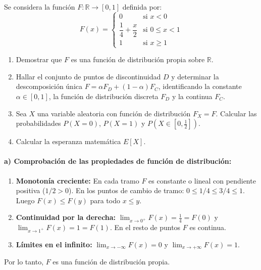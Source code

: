\begin{problema}
Se considera la función $F : \mathbb{R} \to [0, 1]$ definida por:
\[
    F(x) = \begin{cases} 
        0 & \text{si } x < 0 \\
        \dfrac{1}{4} + \dfrac{x}{2} & \text{si } 0 \le x < 1 \\
        1 & \text{si } x \ge 1
    \end{cases}
\]
\begin{enumerate}[label=\alph*)]
    \item Demostrar que $F$ es una función de distribución propia sobre $\mathbb{R}$.
    \item Hallar el conjunto de puntos de discontinuidad $D$ y determinar la descomposición única $F = \alpha F_D + (1-\alpha) F_C$, identificando la constante $\alpha \in [0,1]$, la función de distribución discreta $F_D$ y la continua $F_C$.
    \item Sea $X$ una variable aleatoria con función de distribución $F_X = F$. Calcular las probabilidades $P(X = 0)$, $P(X = 1)$ y $P\left(X \in \left[0, \frac{1}{2}\right]\right)$.
    \item Calcular la esperanza matemática $E[X]$.
\end{enumerate}

\tcblower

\paragraph{a) Comprobación de las propiedades de función de distribución:}
\begin{enumerate}[label=\arabic*.]
    \item \textbf{Monotonía creciente:} En cada tramo $F$ es constante o lineal con pendiente positiva ($1/2 > 0$). En los puntos de cambio de tramo: $0 \le 1/4 \le 3/4 \le 1$. Luego $F(x) \le F(y)$ para todo $x \le y$.
    \item \textbf{Continuidad por la derecha:}
    $\lim_{x \to 0^+} F(x) = \frac{1}{4} = F(0)$ y $\lim_{x \to 1^+} F(x) = 1 = F(1)$. En el resto de puntos $F$ es continua.
    \item \textbf{Límites en el infinito:} $\lim_{x \to -\infty} F(x) = 0$ y $\lim_{x \to +\infty} F(x) = 1$.
\end{enumerate}
Por lo tanto, $F$ es una función de distribución propia.


\end{problema}
